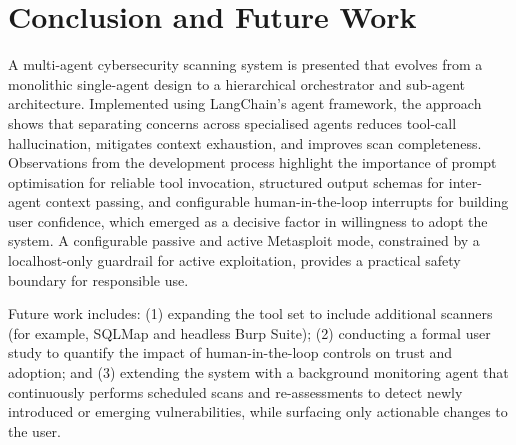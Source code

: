 \documentclass[sigconf,anonymous]{acmart}
\begin{document}
\section{Conclusion and Future  Work}
\label{sec:conclusion}

A multi-agent cybersecurity scanning system is presented that evolves from a monolithic single-agent design to a hierarchical orchestrator and sub-agent architecture. Implemented using LangChain’s agent framework, the approach shows that separating concerns across specialised agents reduces tool-call hallucination, mitigates context exhaustion, and improves scan completeness. Observations from the development process highlight the importance of prompt optimisation for reliable tool invocation, structured output schemas for inter-agent context passing, and configurable human-in-the-loop interrupts for building user confidence, which emerged as a decisive factor in willingness to adopt the system. A configurable passive and active Metasploit mode, constrained by a localhost-only guardrail for active exploitation, provides a practical safety boundary for responsible use.

Future work includes: (1) expanding the tool set to include additional scanners (for example, SQLMap and headless Burp Suite); (2) conducting a formal user study to quantify the impact of human-in-the-loop controls on trust and adoption; and (3) extending the system with a background monitoring agent that continuously performs scheduled scans and re-assessments to detect newly introduced or emerging vulnerabilities, while surfacing only actionable changes to the user.
\end{document}
